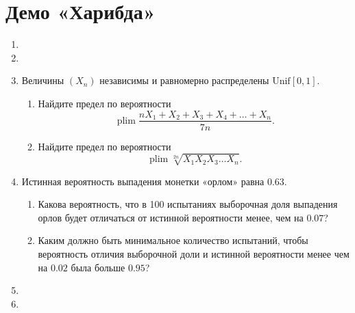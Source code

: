 \documentclass[12pt]{article}
\DeclareMathOperator{\plim}{plim}
\newcommand \dUnif{\mathrm{Unif}}
\begin{document}
\section*{Демо «Харибда»}
\begin{enumerate}
\item 
\item 
\item Величины $(X_n)$ независимы и равномерно распределены $\dUnif[0, 1]$.

\begin{enumerate}
  \item Найдите предел по вероятности
  \[
  \plim \frac{nX_1 + X_2 + X_3  + X_4 + \dots + X_n}{7n}.
  \]
  \item Найдите предел по вероятности
  \[
  \plim \sqrt[2n]{X_1 X_2 X_3 \dots X_n}.
  \]
\end{enumerate}

\item  Истинная вероятность выпадения монетки «орлом» равна $0.63$.
\begin{enumerate}
\item Какова вероятность, что в 100 испытаниях выборочная доля выпадения орлов будет
отличаться от истинной вероятности менее, чем на $0.07$?
\item Каким должно быть минимальное количество испытаний, чтобы вероятность отличия
выборочной доли и истинной вероятности менее чем на $0.02$ была больше $0.95$?
\end{enumerate}

\item 
\item 



\end{enumerate}
\end{document}
